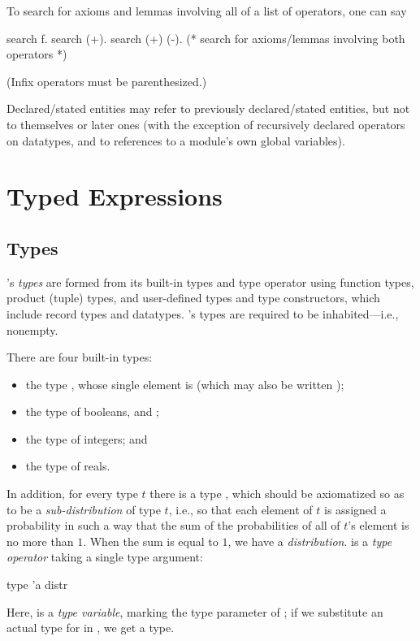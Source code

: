 To search for axioms and lemmas involving all of a list of operators,
one can say
\begin{easycrypt}{}{}
search f.
search (+).
search (+) (-).  (* search for axioms/lemmas involving both operators *)
\end{easycrypt}
(Infix operators must be parenthesized.)

Declared/stated entities may refer to previously declared/stated entities,
but not to themselves or later ones (with the exception of recursively
declared operators on datatypes, and to references to a module's own
global variables).

\section{Typed Expressions}

\subsection{Types}

\EasyCrypt's \emph{types} are formed from its built-in types and
type operator using function types, product (tuple) types, and
user-defined types and type constructors, which include record types
and datatypes. \EasyCrypt's types are required to be inhabited---i.e.,
nonempty.

There are four built-in types:
\begin{itemize}
\item the type , whose single element is  (which may
  also be written \ec{()});

\item the type  of booleans,  and ;

\item the type  of integers; and

\item the type  of reals.
\end{itemize}

In addition, for every type $t$ there is a type , which
should be axiomatized so as to be a \emph{sub-distribution} of type
$t$, i.e., so that each element of $t$ is assigned a probability in
such a way that the sum of the probabilities of all of $t$'s element
is no more than $1$. When the sum is equal to $1$, we have a
\emph{distribution}.  is a \emph{type operator} taking a
single type argument:
\begin{easycrypt}{}{}
type 'a distr
\end{easycrypt}
Here,  is a \emph{type variable}, marking the type parameter of
; if we substitute an actual type for  in ,
we get a type.

